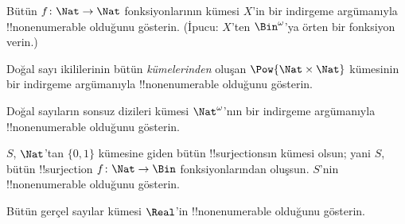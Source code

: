 \begin{prob}\label{sfr:siz:red-alt:prob:nat-nat}
  Bütün $f\colon\Nat\to\Nat$ fonksiyonlarının kümesi $X$'in bir indirgeme
  argümanıyla !!{nonenumerable} olduğunu gösterin. (İpucu: $X$'ten
  $\Bin^\omega$'ya örten bir fonksiyon verin.)
\end{prob}

\begin{prob}
Doğal sayı ikililerinin bütün \emph{kümelerinden} oluşan
$\Pow{\Nat\times\Nat}$ kümesinin bir indirgeme argümanıyla !!{nonenumerable}
olduğunu gösterin.
\end{prob}

\begin{prob}
Doğal sayıların sonsuz dizileri kümesi $\Nat^\omega$'nın bir indirgeme
argümanıyla !!{nonenumerable} olduğunu gösterin.
\end{prob}


\begin{prob}
$S$, $\Nat$'tan $\{0,1\}$ kümesine giden bütün !!{surjection}s{}ın kümesi
olsun; yani $S$, bütün !!{surjection} $f\colon\Nat\to\Bin$ fonksiyonlarından
oluşsun. $S$'nin !!{nonenumerable} olduğunu gösterin.
\end{prob}

\begin{prob}
Bütün gerçel sayılar kümesi $\Real$'in !!{nonenumerable} olduğunu gösterin.
\end{prob}

